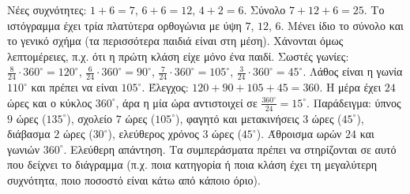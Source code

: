  Νέες συχνότητες: $1+6=7$, $6+6=12$, $4+2=6$. Σύνολο $7+12+6=25$. Το ιστόγραμμα έχει τρία πλατύτερα ορθογώνια με ύψη $7$, $12$, $6$. Μένει ίδιο το σύνολο και το γενικό σχήμα (τα περισσότερα παιδιά είναι στη μέση). Χάνονται όμως λεπτομέρειες, π.χ. ότι η πρώτη κλάση είχε μόνο ένα παιδί.
 Σωστές γωνίες: $\frac{8}{24}\cdot360^\circ=120^\circ$, $\frac{6}{24}\cdot360^\circ=90^\circ$, $\frac{7}{24}\cdot360^\circ=105^\circ$, $\frac{3}{24}\cdot360^\circ=45^\circ$. Λάθος είναι η γωνία $110^\circ$ και πρέπει να είναι $105^\circ$. Έλεγχος: $120+90+105+45=360$.
 Η μέρα έχει $24$ ώρες και ο κύκλος $360^\circ$, άρα η μία ώρα αντιστοιχεί σε $\frac{360^\circ}{24}=15^\circ$. Παράδειγμα: ύπνος $9$ ώρες ($135^\circ$), σχολείο $7$ ώρες ($105^\circ$), φαγητό και μετακινήσεις $3$ ώρες ($45^\circ$), διάβασμα $2$ ώρες ($30^\circ$), ελεύθερος χρόνος $3$ ώρες ($45^\circ$). Άθροισμα ωρών $24$ και γωνιών $360^\circ$.
 Ελεύθερη απάντηση. Τα συμπεράσματα πρέπει να στηρίζονται σε αυτό που δείχνει το διάγραμμα (π.χ. ποια κατηγορία ή ποια κλάση έχει τη μεγαλύτερη συχνότητα, ποιο ποσοστό είναι κάτω από κάποιο όριο).
